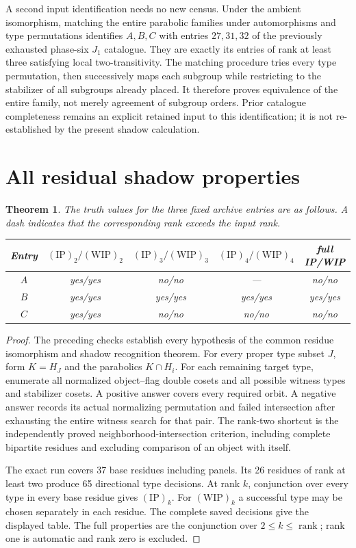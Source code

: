 \documentclass[11pt,a4paper]{article}
\newtheorem{theorem}{Theorem}
\begin{document}
A second input identification needs no new census. Under the ambient
isomorphism, matching the entire parabolic families under automorphisms
and type permutations identifies $A,B,C$ with entries $27,31,32$ of the
previously exhausted phase-six $J_1$ catalogue. They are exactly its entries
of rank at least three satisfying local two-transitivity. The matching
procedure tries every type permutation, then successively maps each
subgroup while restricting to the stabilizer of all subgroups already
placed. It therefore proves equivalence of the entire family, not merely
agreement of subgroup orders. Prior catalogue completeness remains an
explicit retained input to this identification; it is not re-established
by the present shadow calculation.

\section{All residual shadow properties}
\begin{theorem}
The truth values for the three fixed archive entries are as follows.
A dash indicates that the corresponding rank exceeds the input rank.
\begin{center}\begin{tabular}{ccccc}\toprule
Entry & $(\mathrm{IP})_2/(\mathrm{WIP})_2$ &
$(\mathrm{IP})_3/(\mathrm{WIP})_3$ &
$(\mathrm{IP})_4/(\mathrm{WIP})_4$ & full IP/WIP\\\midrule
$A$&yes/yes&no/no&---&no/no\\
$B$&yes/yes&yes/yes&yes/yes&yes/yes\\
$C$&yes/yes&no/no&no/no&no/no\\\bottomrule
\end{tabular}\end{center}
\end{theorem}
\begin{proof}
The preceding checks establish every hypothesis of the common residue
isomorphism and shadow recognition theorem. For every proper type subset
$J$, form $K=H_J$ and the parabolics $K\cap H_i$. For each remaining target
type, enumerate all normalized object--flag double cosets and all possible
witness types and stabilizer cosets. A positive answer covers every
required orbit. A negative answer records its actual normalizing
permutation and failed intersection after exhausting the entire witness
search for that pair. The rank-two shortcut is the independently proved
neighborhood-intersection criterion, including complete bipartite residues
and excluding comparison of an object with itself.

The exact run covers 37 base residues including panels. Its 26 residues
of rank at least two produce 65 directional type decisions. At rank $k$,
conjunction over every type in every base residue gives $(\mathrm{IP})_k$.
For $(\mathrm{WIP})_k$ a successful type may be chosen separately in each
residue. The complete saved decisions give the displayed table. The full
properties are the conjunction over $2\leq k\leq\operatorname{rank}$;
rank one is automatic and rank zero is excluded.
\end{proof}
\end{document}
